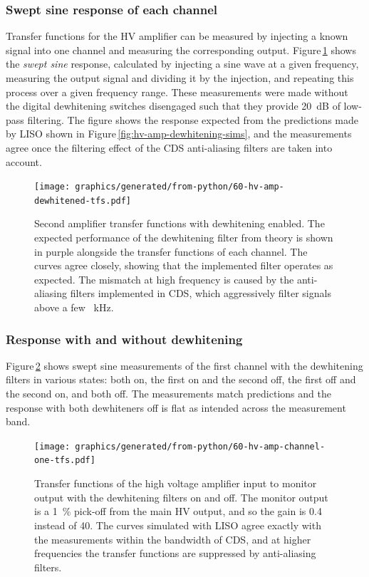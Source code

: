 \subsubsection{Swept sine response of each channel}
Transfer functions for the \gls{HV} amplifier can be measured by injecting a known signal into one channel and measuring the corresponding output. Figure\,\ref{fig:hv-amp-dewhitened-tfs} shows the \emph{swept sine} response, calculated by injecting a sine wave at a given frequency, measuring the output signal and dividing it by the injection, and repeating this process over a given frequency range. These measurements were made without the digital dewhitening switches disengaged such that they provide \SI{20}{\deci\bel} of low-pass filtering. The figure shows the response expected from the predictions made by \gls{LISO} shown in Figure\,\ref{fig:hv-amp-dewhitening-sims}, and the measurements agree once the filtering effect of the \gls{CDS} anti-aliasing filters are taken into account.

\begin{figure}
  \centering
  \texttt{[image: graphics/generated/from-python/60-hv-amp-dewhitened-tfs.pdf]}
  \caption[Frequency response of the high voltage amplifier's channels with dewhitening enabled]{Second amplifier transfer functions with dewhitening enabled. The expected performance of the dewhitening filter from theory is shown in purple alongside the transfer functions of each channel. The curves agree closely, showing that the implemented filter operates as expected. The mismatch at high frequency is caused by the anti-aliasing filters implemented in \gls{CDS}, which aggressively filter signals above a few \SI{}{\kilo\hertz}.}
  \label{fig:hv-amp-dewhitened-tfs}
\end{figure}

\subsubsection{Response with and without dewhitening}
Figure\,\ref{fig:hv-amp-channel-one-tfs} shows swept sine measurements of the first channel with the dewhitening filters in various states: both on, the first on and the second off, the first off and the second on, and both off. The measurements match predictions and the response with both dewhiteners off is flat as intended across the measurement band.

\begin{figure}
  \centering
  \texttt{[image: graphics/generated/from-python/60-hv-amp-channel-one-tfs.pdf]}
  \caption[Transfer functions of the high voltage amplifier input to monitor output with the dewhiteners on and off]{Transfer functions of the high voltage amplifier input to monitor output with the dewhitening filters on and off. The monitor output is a \SI{1}{\percent} pick-off from the main \gls{HV} output, and so the gain is \num{0.4} instead of \num{40}. The curves simulated with \gls{LISO} agree exactly with the measurements within the bandwidth of \gls{CDS}, and at higher frequencies the transfer functions are suppressed by anti-aliasing filters.}
  \label{fig:hv-amp-channel-one-tfs}
\end{figure}

